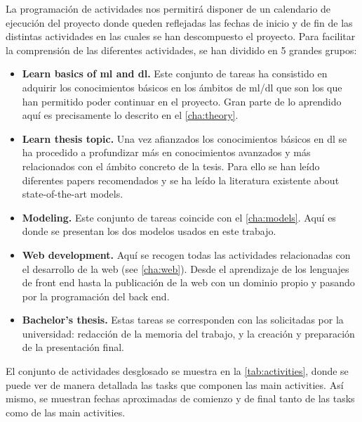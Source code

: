 La programación de actividades nos permitirá disponer de un calendario de
ejecución del proyecto donde queden reflejadas las fechas de inicio y de fin de
las distintas actividades en las cuales se han descompuesto el proyecto. Para
facilitar la comprensión de las diferentes actividades, se han dividido en 5
grandes grupos:
\begin{itemize}
  \item \textbf{Learn basics of \gls{ml} and \gls{dl}.} Este conjunto de tareas
  ha consistido en adquirir los conocimientos básicos en los ámbitos de
  \gls{ml}/\gls{dl} que son los que han permitido poder continuar en el
  proyecto. Gran parte de lo aprendido aquí es precisamente lo descrito en el
  \vref{cha:theory}.
  \item \textbf{Learn thesis topic.} Una vez afianzados los conocimientos
  básicos en \gls{dl} se ha procedido a profundizar más en conocimientos
  avanzados y más relacionados con el ámbito concreto de la tesis. Para ello se
  han leído diferentes papers recomendados y se ha leído la literatura
  existente about state-of-the-art models.
  \item \textbf{Modeling.} Este conjunto de tareas coincide con el
  \vref{cha:models}. Aquí es donde se presentan los dos modelos usados en este
  trabajo.
  \item \textbf{Web development.} Aquí se recogen todas las actividades
  relacionadas con el desarrollo de la web (see \vref{cha:web}). Desde el
  aprendizaje de los lenguajes de front end hasta la publicación de la web con
  un dominio propio y pasando por la programación del back end.
  \item \textbf{Bachelor's thesis.} Estas tareas se corresponden con las
  solicitadas por la universidad: redacción de la memoria del trabajo, y la
  creación y preparación de la presentación final.
\end{itemize}

El conjunto de actividades desglosado se muestra en la
\vref{tab:activities}, donde se puede ver de manera detallada las tasks que
componen las main activities. Así mismo, se muestran fechas aproximadas de
comienzo y de final tanto de las tasks como de las main activities.

